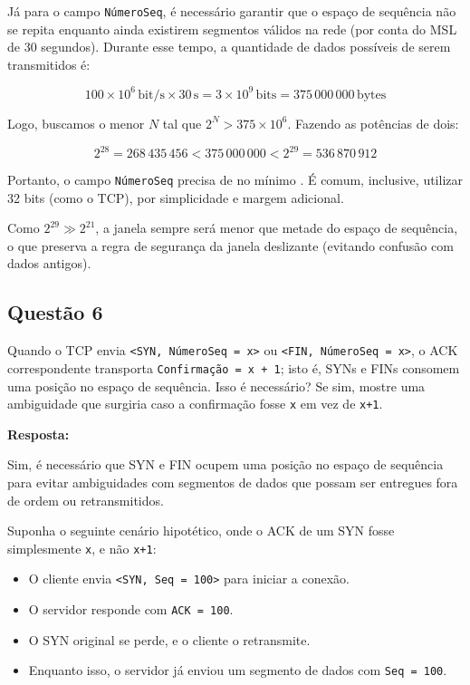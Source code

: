 Já para o campo \texttt{NúmeroSeq}, é necessário garantir que o espaço de sequência não se repita enquanto ainda existirem segmentos válidos na rede (por conta do MSL de 30 segundos). Durante esse tempo, a quantidade de dados possíveis de serem transmitidos é:

\[
100\times10^6 \, \text{bit/s} \times 30\,\text{s} = 3\times10^9\,\text{bits} = 375\,000\,000\,\text{bytes}
\]

Logo, buscamos o menor $N$ tal que $2^N > 375 \times 10^6$. Fazendo as potências de dois:

\[
2^{28} = 268\,435\,456 < 375\,000\,000 < 2^{29} = 536\,870\,912
\]

Portanto, o campo \texttt{NúmeroSeq} precisa de no mínimo . É comum, inclusive, utilizar 32 bits (como o TCP), por simplicidade e margem adicional.

Como $2^{29} \gg 2^{21}$, a janela sempre será menor que metade do espaço de sequência, o que preserva a regra de segurança da janela deslizante (evitando confusão com dados antigos).

\bigskip
\subsection{Questão 6}
Quando o TCP envia \texttt{<SYN, NúmeroSeq = x>} ou \texttt{<FIN, NúmeroSeq = x>}, o ACK correspondente transporta \texttt{Confirmação = x + 1}; isto é, SYNs e FINs consomem uma posição no espaço de sequência.  
Isso é necessário? Se sim, mostre uma ambiguidade que surgiria caso a confirmação fosse \texttt{x} em vez de \texttt{x+1}.

\noindent\textbf{Resposta:}

Sim, é necessário que SYN e FIN ocupem uma posição no espaço de sequência para evitar ambiguidades com segmentos de dados que possam ser entregues fora de ordem ou retransmitidos.

Suponha o seguinte cenário hipotético, onde o ACK de um SYN fosse simplesmente \texttt{x}, e não \texttt{x+1}:

\begin{itemize}
    \item O cliente envia \texttt{<SYN, Seq = 100>} para iniciar a conexão.
    \item O servidor responde com \texttt{ACK = 100}.
    \item O SYN original se perde, e o cliente o retransmite.
    \item Enquanto isso, o servidor já enviou um segmento de dados com \texttt{Seq = 100}.
\end{itemize}


